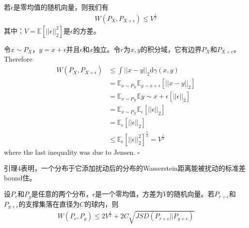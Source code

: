             \begin{lemma}[Lemma4]
            若$\epsilon$是零均值的随机向量，则我们有
            \begin{align*}
            W(P_X,P_{X+\epsilon}) \leqslant V^{\frac{1}{2}}
            \end{align*}
            其中：$V = \mathbb{E}[||\epsilon||_2^2]$是$\epsilon$的方差。
            \end{lemma}
            \begin{Proof}
            令$x\sim P_X$，$y = x+\epsilon$并且$\epsilon$和$x$独立。令$r$为$x,y$的积分域，它有边界$P_X$和$P_{X+\epsilon}$。Therefore
            \begin{align*}
            W(P_X,P_{X+\epsilon})& \leqslant \int ||x-y||_2\mathrm{d}\gamma(x,y)\\
            & = \mathbb{E}_{x\sim P_X}\mathbb{E}_{y\sim x+\epsilon} [||x-y||_2]\\
            &=\mathbb{E}_{x\sim P_X}\mathbb{E}{y\sim x+\epsilon}[||\epsilon||_2]\\
            &=\mathbb{E}_{x\sim P_X}\mathbb{E}_\epsilon [||\epsilon||_2]\\
            &=\mathbb{E}_\epsilon[||\epsilon||_2]\\
            & \leqslant \mathbb{E}_\epsilon[||\epsilon||_2^2]^{\frac{1}{2}} = V^{\frac{1}{2}}
            \end{align*}
            where the last inequality was due to Jensen. $\square$
            \end{Proof}
            引理4表明，一个分布于它添加扰动后的分布的Wasserstein距离能被扰动的标准差bound住。
            \begin{theorem}[Theorem 3.3]
            设$P_r$和$P_g$是任意的两个分布，$\epsilon$是一个零均值，方差为$V$的随机向量。若$P_{r+\epsilon}$和$P_{g+\epsilon}$的支撑集落在直径为$C$的球内，则
            \begin{align*}
            W(P_r,P_g) \leqslant 2 V^{\frac{1}{2}}+2C\sqrt{JSD(P_{r+\epsilon}||P_{g+\epsilon})}
            \end{align*}
            \end{theorem}
